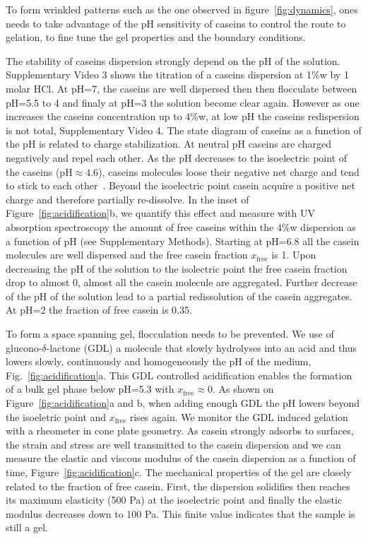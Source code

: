 \documentclass[twocolumn,superscriptaddress,showpacs,preprintnumbers,
amsmath,amssymb,prl]{revtex4-1}
\begin{document}
To form wrinkled patterns such as the one observed in figure~\ref{fig:dynamics}, ones needs to take advantage of the pH sensitivity of caseins to control the route to gelation, to fine tune the gel properties and the boundary conditions.

The stability of caseins dispersion strongly depend on the pH of the solution. Supplementary Video 3 shows the titration of a caseins dispersion at 1\%w by 1 molar HCl. At pH=7, the caseins are well dispersed then then flocculate between pH=5.5 to 4 and finaly at pH=3 the solution become clear again. However as one increases the caseins concentration up to 4\%w, at low pH the caseins redispersion is not total, Supplementary Video 4. The state diagram of caseins as a function of the pH is related to charge stabilization. At neutral pH caseins are charged negatively and repel each other. As the pH decreases to the isoelectric point of the caseins (pH$\approx 4.6$), caseins molecules loose their negative net charge and tend to stick to each other~\cite{Roefs1986,Bremer1989}. Beyond the isoelectric point casein acquire a positive net charge and therefore partially re-dissolve. In the inset of Figure~\ref{fig:acidification}b, we quantify this effect and measure with UV absorption spectroscopy the amount of free caseins within the 4\%w dispersion as a function of pH (see Supplementary Methods). Starting at pH=6.8 all the casein molecules are well dispersed and the free casein fraction $x_\text{free}$ is 1. Upon decreasing the pH of the solution to the isolectric point the free casein fraction drop to almost 0, almost all the casein molecule are aggregated. Further decrease of the pH of the solution lead to a partial redissolution of the casein aggregates. At pH=2 the fraction of free casein is 0.35.


To form a space spanning gel, flocculation needs to be prevented. We use of glucono-$\delta$-lactone (GDL) a molecule  that slowly hydrolyses into an acid and thus lowers slowly, continuously and homogeneously the pH of the medium, Fig.~\ref{fig:acidification}a. This GDL controlled acidification enables the formation of a bulk gel phase below pH=5.3 with $x_\text{free}\approx 0$. As shown on Figure~\ref{fig:acidification}a and b, when adding enough GDL the pH lowers beyond the isoeletric point and $x_\text{free}$ rises again. We monitor the GDL induced gelation with a rheometer in cone plate geometry. As casein strongly adsorbs to surfaces, the strain and stress are well transmitted to the casein dispersion and we can measure the elastic and viscous modulus of the casein dispersion as a function of time, Figure~\ref{fig:acidification}c. The mechanical properties of the gel are closely related to the fraction of free casein. First, the dispersion solidifies then reaches its maximum elasticity (500 Pa) at the isoelectric point and finally the elastic modulus decreases down to 100 Pa. This finite value indicates that the sample is still a gel.
\end{document}
